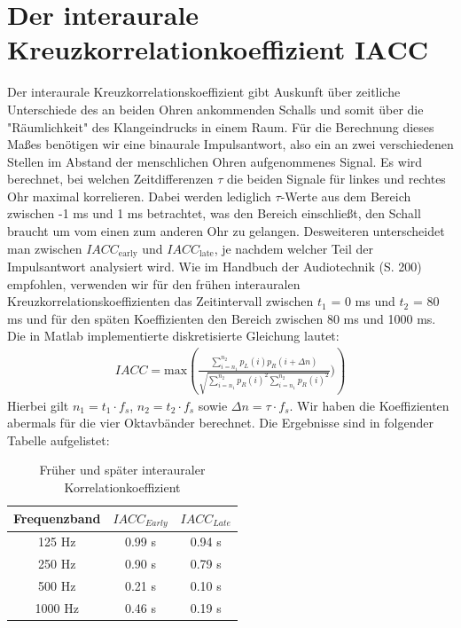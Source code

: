 \section{Der interaurale Kreuzkorrelationkoeffizient $\mathbf{IACC}$}
\label{sec:iacc}

Der interaurale Kreuzkorrelationskoeffizient gibt Auskunft über zeitliche Unterschiede des an beiden Ohren ankommenden Schalls und somit über die "Räumlichkeit" des Klangeindrucks in einem Raum. 
Für die Berechnung dieses Maßes benötigen wir eine binaurale Impulsantwort, also ein an zwei verschiedenen Stellen im Abstand der menschlichen Ohren aufgenommenes Signal. 
Es wird berechnet, bei welchen Zeitdifferenzen $\tau$ die beiden Signale für linkes und rechtes Ohr maximal korrelieren.
Dabei werden lediglich $\tau$-Werte aus dem Bereich zwischen -1 ms und 1 ms betrachtet, was den Bereich einschließt, den Schall braucht um vom einen zum anderen Ohr zu gelangen.  
Desweiteren unterscheidet man zwischen $IACC_{\mathrm{early}}$ und $IACC_{\mathrm{late}}$, je nachdem welcher Teil der Impulsantwort analysiert wird. Wie im Handbuch der Audiotechnik \cite{Weinzierl08} (S. 200) empfohlen, verwenden wir für den frühen interauralen Kreuzkorrelationskoeffizienten das Zeitintervall zwischen $t_1$ = 0 ms und $t_2$ = 80 ms und für den späten Koeffizienten den Bereich zwischen 80 ms und 1000 ms. 
Die in Matlab implementierte diskretisierte Gleichung lautet:
\begin{align*}
IACC = \mathrm{max}\left( \frac{\sum_{i=n_1}^{n_2} p_L(i)p_R(i+\Delta n)} {\sqrt{\sum_{i=n_1}^{n_2}p_R(i)^2 \sum_{i=n_1}^{n_2} p_R(i)^2 }})\right) 
\end{align*}
Hierbei gilt $n_1 = t_1 \cdot f_s$,  $n_2 = t_2 \cdot f_s$ sowie $\Delta n = \tau \cdot f_s$.
Wir haben die Koeffizienten abermals für die vier Oktavbänder berechnet.
Die Ergebnisse sind in folgender Tabelle aufgelistet:
\begin{table}[H]
    \centering
    \caption{Früher und später interauraler Korrelationkoeffizient}
    \label{tab:iacc}
    \begin{tabular}[\textwidth]{|c|c|c|}
    \hline
        Frequenzband & $IACC_{Early}$ &$IACC_{Late}$ \\
        \hline
        125 Hz & 0.99 s & 0.94 s \\
        250 Hz & 0.90 s & 0.79 s \\
        500 Hz & 0.21 s & 0.10 s \\
        1000 Hz & 0.46 s & 0.19 s \\
        \hline
    \end{tabular}
\end{table}

